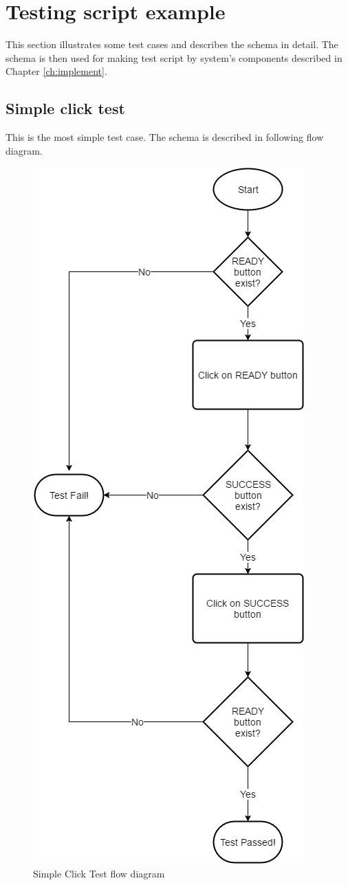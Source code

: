 \section{Testing script example}
\label{sec:eg_script}
This section illustrates some test cases and describes the schema in detail. The schema is then used for making test script by system's components described in Chapter \ref{ch:implement}.

\subsection{Simple click test}
This is the most simple test case. The schema is described in following flow diagram.
	\begin{figure}[H]
		\centering
		\includegraphics[scale=0.55]{Chapters/Fig/click_test_diag.png}
		\caption{Simple Click Test flow diagram}
		\label{fig:click_test_diag}
	\end{figure}

